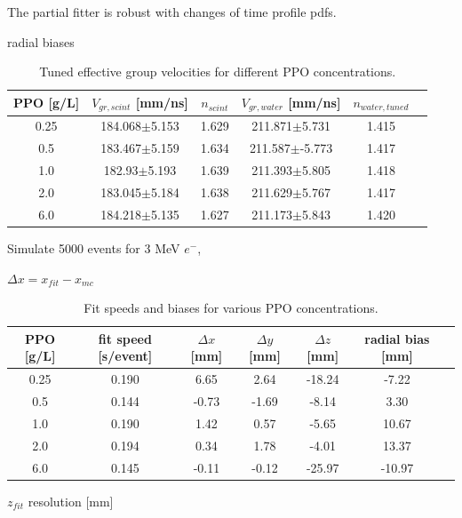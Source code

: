 The partial fitter is robust with changes of time profile pdfs.


radial biases
\begin{table}[ht]
	\centering
	\caption{\label{partial_groupV}Tuned effective group velocities for different PPO concentrations.}	
	{\centering
		\begin{tabular*}{140mm}{c@{\extracolsep{\fill}}ccccc}
			\toprule 
			PPO [g/L] & $V_{gr,scint}$ [mm/ns]& $n_{scint}$ & $V_{gr,water}$ [mm/ns]& $n_{water,tuned}$\\
			\midrule
			0.25 & 184.068$\pm$5.153 & 1.629 & 211.871$\pm$5.731 & 1.415\\
			0.5  & 183.467$\pm$5.159 &1.634& 211.587$\pm$-5.773 & 1.417 \\
			1.0 & 182.93$\pm$5.193 &1.639& 211.393$\pm$5.805& 1.418 \\
			2.0 & 183.045$\pm$5.184& 1.638& 211.629$\pm$5.767 & 1.417	\\
			6.0 & 184.218$\pm$5.135& 1.627& 211.173$\pm$5.843 &1.420\\
			\bottomrule	
		\end{tabular*}
	}
\end{table}


Simulate 5000 events for 3 MeV $e^-$,  


$\Delta x = x_{fit}-x_{mc}$

\begin{table}[ht]
	\centering
	\caption{\label{partial_bias} Fit speeds and biases for various PPO concentrations.}	
	{\centering
		\begin{tabular*}{150mm}{c@{\extracolsep{\fill}}cccccc}
			\toprule 
			PPO [g/L] & fit speed [s/event]& $\Delta x$ [mm]& $\Delta y$ [mm]& $\Delta z$ [mm] & radial bias [mm] & \\
			\midrule
			0.25 & 0.190 &6.65 &2.64& -18.24& -7.22\\
			0.5  & 0.144 &-0.73 &-1.69& -8.14& 3.30 \\
			1.0 &0.190 & 1.42 &0.57 &-5.65& 10.67 \\
			2.0 &0.194 & 0.34 &1.78& -4.01& 13.37	\\
			6.0 &0.145 & -0.11& -0.12& -25.97& -10.97\\
			\bottomrule	
		\end{tabular*}
	}
\end{table}

$z_{fit}$ resolution [mm] 


